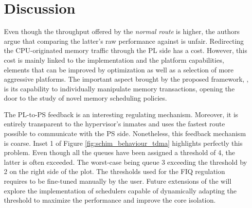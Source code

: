 \section{Discussion}
Even though the throughput offered by the \emph{normal route} is higher, the
authors argue that comparing the latter's raw performance against \schim is unfair.
Redirecting the CPU-originated memory traffic through the PL side has a cost.
However, this cost is mainly linked to the implementation and the platform capabilities, elements that can be improved by optimization as well as a selection of more aggressive platforms.
The important aspect brought by the proposed framework, \schim, is its capability to individually manipulate memory transactions, opening the door to the study of novel memory scheduling policies.

The PL-to-PS feedback is an interesting regulating mechanism. Moreover, it is entirely transparent to the hypervisor's inmates and uses the fastest route possible to communicate with the PS side. Nonetheless, this feedback mechanism is coarse. Inset 1 of Figure \ref{fig:schim_behaviour_tdma} highlights perfectly this problem. Even though all the queues have been assigned a threshold of 4, the latter is often exceeded. The worst-case being queue 3 exceeding the threshold by 2 on the right side of the plot.
The thresholds used for the FIQ regulation requires to be fine-tuned manually by the user. Future extensions of the \schim will explore the implementation of schedulers capable of dynamically adapting the threshold to maximize the performance and improve the core isolation.
